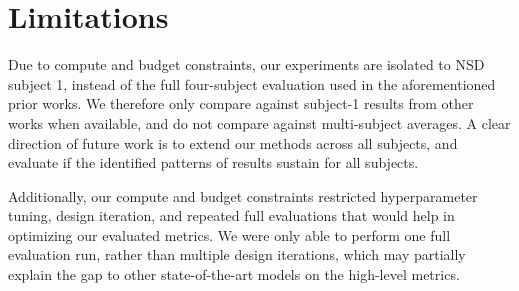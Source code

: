 \section{Limitations}
\label{sec:limitations}


Due to compute and budget constraints, our experiments are isolated to NSD subject 1, instead of the full four-subject evaluation used in the aforementioned prior works. We therefore only compare against subject-1 results from other works when available, and do not compare against multi-subject averages. A clear direction of future work is to extend our methods across all subjects, and evaluate if the identified patterns of results sustain for all subjects.

Additionally, our compute and budget constraints restricted hyperparameter tuning, design iteration, and repeated full evaluations that would help in optimizing our evaluated metrics. We were only able to perform one full evaluation run, rather than multiple design iterations, which may partially explain the gap to other state-of-the-art models on the high-level metrics.